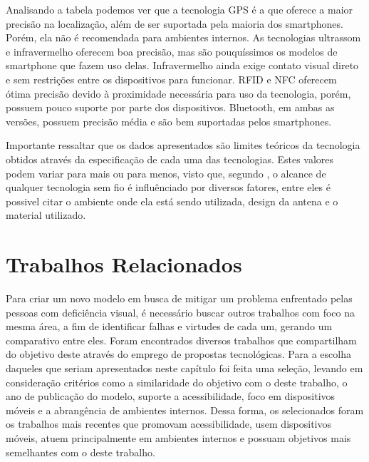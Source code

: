\documentclass[english,brazilian]{UNISINOSmonografia}
\begin{document}
Analisando a tabela podemos ver que a tecnologia GPS é a que oferece a maior precisão na localização, além de ser suportada pela maioria dos smartphones. Porém, ela não é recomendada para ambientes internos. As tecnologias ultrassom e infravermelho oferecem boa precisão, mas são pouquíssimos os modelos de smartphone que fazem uso delas. Infravermelho ainda exige contato visual direto e sem restrições entre os dispositivos para funcionar. RFID e NFC oferecem ótima precisão devido à proximidade necessária para uso da tecnologia, porém, possuem pouco suporte por parte dos dispositivos. Bluetooth, em ambas as versões, possuem precisão média e são bem suportadas pelos smartphones.

Importante ressaltar que os dados apresentados são limites teóricos da tecnologia obtidos através da especificação de cada uma das tecnologias. Estes valores podem variar para mais ou para menos, visto que, segundo , o alcance de qualquer tecnologia sem fio é influênciado por diversos fatores, entre eles é possivel citar o ambiente onde ela está sendo utilizada, design da antena e o material utilizado.

\chapter{Trabalhos Relacionados}

Para criar um novo modelo em busca de mitigar um problema enfrentado pelas pessoas com deficiência visual, é necessário buscar outros trabalhos com foco na mesma área, a fim de identificar falhas e virtudes de cada um, gerando um comparativo entre eles. Foram encontrados diversos trabalhos que compartilham do objetivo deste através do emprego de propostas tecnológicas. Para a escolha daqueles que seriam apresentados neste capítulo foi feita uma seleção, levando em consideração critérios como a similaridade do objetivo com o deste trabalho, o ano de publicação do modelo, suporte a acessibilidade, foco em dispositivos móveis e a abrangência de ambientes internos. Dessa forma, os selecionados foram os trabalhos mais recentes que promovam acessibilidade, usem dispositivos móveis, atuem principalmente em ambientes internos e possuam objetivos mais semelhantes com o deste trabalho.
\end{document}
